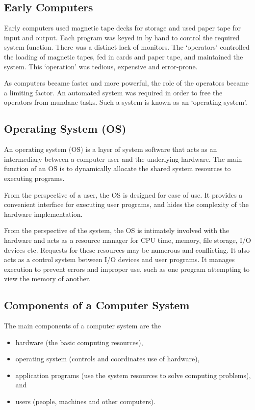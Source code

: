 \subsection{Early Computers}

Early computers used magnetic tape decks for storage and used paper tape for input and output.
Each program was keyed in by hand to control the required system function.
There was a distinct lack of monitors.
The `operators' controlled the loading of magnetic tapes, fed in cards and paper tape, and maintained the system.
This `operation' was tedious, expensive and error-prone.

As computers became faster and more powerful, the role of the operators became a limiting factor.
An automated system was required in order to free the operators from mundane tasks.
Such a system is known as an `operating system'.

\subsection{Operating System (OS)}

An operating system (OS) is a layer of system software that acts as an intermediary between a computer user and the underlying hardware.
The main function of an OS is to dynamically allocate the shared system resources to executing programs.

From the perspective of a user, the OS is designed for ease of use.
It provides a convenient interface for executing user programs, and hides the complexity of the hardware implementation.

From the perspective of the system, the OS is intimately involved with the hardware and acts as a resource manager for CPU time, memory, file storage, I/O devices etc.
Requests for these resources may be numerous and conflicting.
It also acts as a control system between I/O devices and user programs.
It manages execution to prevent errors and improper use, such as one program attempting to view the memory of another.

\subsection{Components of a Computer System}

The main components of a computer system are the
\begin{itemize}
  \item hardware (the basic computing resources),
  \item operating system (controls and coordinates use of hardware),
  \item application programs (use the system resources to solve computing problems), and
  \item users (people, machines and other computers).
\end{itemize}

